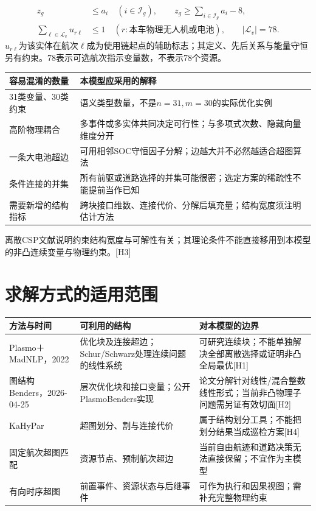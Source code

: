 \begin{align*}
 z_g&\le a_i\quad(i\in\mathcal I_g),\qquad
 z_g\ge\sum_{i\in\mathcal I_g}a_i-8,\\
 \sum_{\ell\in\mathcal L_v}u_{r\ell}&\le1
 \quad(r:\text{本车物理无人机或电池}),\qquad|\mathcal L_v|=78.
\end{align*}
\noindent $u_{r\ell}$为该实体在航次$\ell$成为使用链起点的辅助标志；其定义、先后关系与能量守恒另有约束。78表示可选航次指示变量数，不表示78个资源。

\begin{center}\small
\begin{tabular}{p{38mm}p{107mm}}\toprule
容易混淆的数量 & 本模型应采用的解释\\\midrule
31类变量、30类约束 & 语义类型数量，不是$n=31,m=30$的实际优化实例\\
高阶物理耦合 & 多事件或多实体共同决定可行性；与多项式次数、隐藏向量维度分开\\
一条大电池超边 & 可用相邻SOC守恒因子分解；边越大并不必然越适合超图算法\\
条件连接的并集 & 所有前驱或道路选择的并集可能很密；选定方案的稀疏性不能提前当作已知\\
需要新增的结构指标 & 跨块接口维数、连接代价、分解后填充量；结构宽度须注明估计方法\\\bottomrule
\end{tabular}\end{center}
\noindent 离散CSP文献说明约束结构宽度与可解性有关；其理论条件不能直接移用到本模型的非凸连续变量与物理约束。[H3]
\clearpage

\section*{求解方式的适用范围}
\begin{center}\small
\begin{tabular}{p{36mm}p{48mm}p{61mm}}\toprule
方法与时间 & 可利用的结构 & 对本模型的边界\\\midrule
Plasmo＋MadNLP，2022 & 优化块及连接超边；Schur/Schwarz处理连续问题的线性系统 & 可研究连续块；不能单独解决全部离散选择或证明非凸全局最优[H1]\\
图结构Benders，2026-04-25 & 层次优化块和接口变量；公开PlasmoBenders实现 & 论文分解针对线性/混合整数线性形式；当前非凸物理子问题需另证有效切面[H2]\\
KaHyPar & 超图划分、割与连接代价 & 属于结构划分工具；不能把划分结果当成巡检方案[H4]\\
固定航次超图匹配 & 资源节点、预制航次超边 & 当前自由航迹和道路决策无法直接保留；不宜作为主模型\\
有向时序超图 & 前置事件、资源状态与后继事件 & 可作为执行和因果视图；需补充完整物理约束\\\bottomrule
\end{tabular}\end{center}

